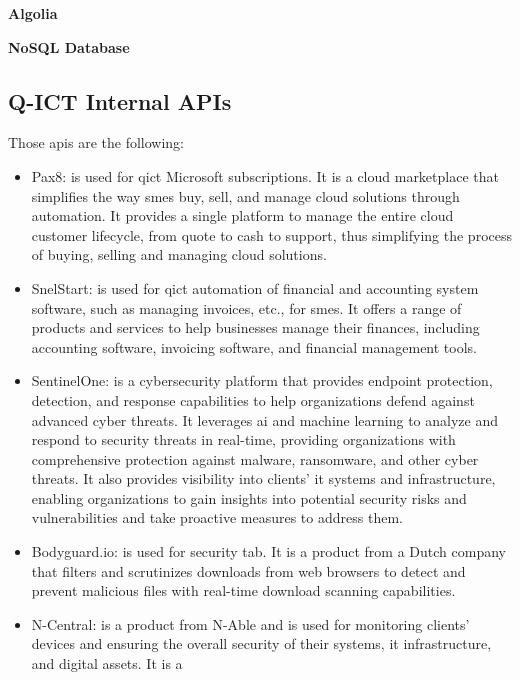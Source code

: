 \begin{multicols}{2}
      \textbf{Algolia}


      \textbf{NoSQL Database}

      \subsection{Q-ICT Internal APIs}
      Those \acrshort{api}s are the following:
      \begin{itemize}
            \item Pax8: is used for \acrshort{qict} Microsoft subscriptions. It is a cloud marketplace that
                  simplifies the way \acrshort{sme}s buy, sell, and manage cloud solutions through automation. It
                  provides a single platform to manage the entire cloud customer lifecycle, from quote to cash to
                  support, thus simplifying the process of buying, selling and managing cloud solutions.
            \item SnelStart: is used for \acrshort{qict} automation of financial and accounting system software,
                  such as managing invoices, etc., for \acrshort{sme}s. It offers a range of products and services
                  to help businesses manage their finances, including accounting software, invoicing software, and
                  financial management tools.
            \item SentinelOne: is a cybersecurity platform that provides endpoint protection, detection, and
                  response capabilities to help organizations defend against advanced cyber threats. It leverages
                  \acrlong{ai} and machine learning to analyze and respond to security threats in real-time,
                  providing organizations with comprehensive protection against malware, ransomware, and other
                  cyber threats. It also provides visibility into clients' \acrshort{it} systems and infrastructure,
                  enabling organizations to gain insights into potential security risks and vulnerabilities and take
                  proactive measures to address them.
            \item Bodyguard.io: is used for security tab. It is a product from a Dutch company that filters and
                  scrutinizes downloads from web browsers to detect and prevent malicious files with real-time
                  download scanning capabilities.
            \item N-Central: is a product from N-Able and is used for monitoring clients' devices and ensuring the
                  overall security of their systems, \acrshort{it} infrastructure, and digital assets. It is a

\end{itemize}
\end{multicols}
